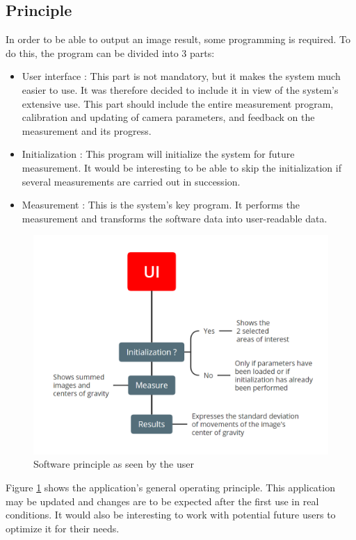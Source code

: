 \subsection{Principle}
In order to be able to output an image result, some programming is required. To do this, the program can be divided into 3 parts:
\begin{itemize}
    \item User interface : This part is not mandatory, but it makes the system much easier to use. It was therefore decided
          to include it in view of the system's extensive use. This part should include the entire measurement program,
          calibration and updating of camera parameters, and feedback on the measurement and its progress.
    \item Initialization : This program will initialize the system for future measurement.
          It would be interesting to be able to skip the initialization if several measurements are carried out in succession.
    \item Measurement : This is the system's key program. It performs the measurement and transforms the software data into user-readable data.
\end{itemize}
\begin{figure}[H]
    \centering
    \includegraphics[scale=0.85]{assets/figures/Software/General.png}
    \caption{Software principle as seen by the user}
    \label{fig:Soft_General}
\end{figure}
Figure \ref{fig:Soft_General} shows the application's general operating principle. This application may be updated and changes
are to be expected after the first use in real conditions. It would also be interesting to work with potential future users
to optimize it for their needs.
\newpage
